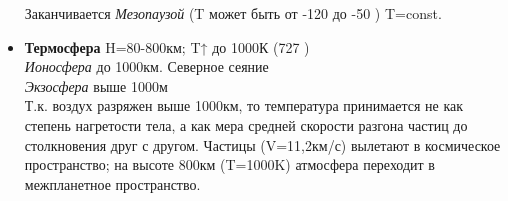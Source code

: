 \begin{itemize}
\begin{itemize}
	\end{itemize}
	Заканчивается \textit{Мезопаузой} (T может быть от -120 \celsius до -50 \celsius) T=const. 
	\item \textbf{Термосфера} H=80-800км; T↑ до 1000К (727 \celsius)\\
	\textit{Ионосфера} до 1000км. Северное сеяние\\
	\textit{Экзосфера} выше 1000м\\
	Т.к. воздух разряжен выше 1000км, то температура принимается не как степень нагретости тела, а как мера средней скорости разгона частиц до столкновения друг с другом. Частицы (V=11,2км/с) вылетают в космическое пространство; на высоте 800км (T=1000K) атмосфера переходит в межпланетное пространство.
\end{itemize}
